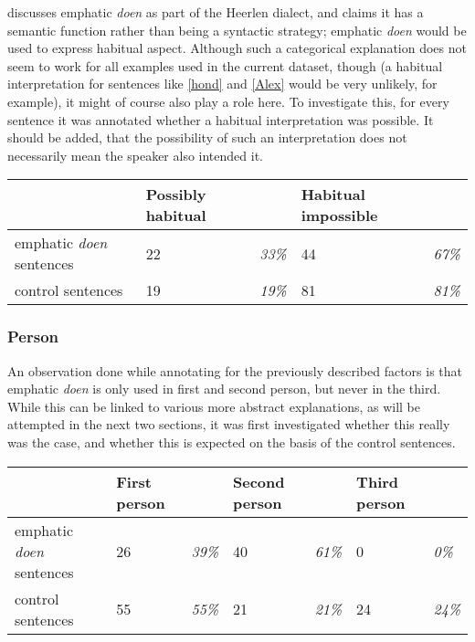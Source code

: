 \documentclass[12pt]{article}
\begin{document}
\citet{c94} discusses emphatic \emph{doen} as part of the Heerlen dialect, and claims it has a semantic function rather than being a syntactic strategy; emphatic \emph{doen} would be used to express habitual aspect. Although such a categorical explanation does not seem to work for all examples used in the current dataset, though (a habitual interpretation for sentences like \ref{hond} and \ref{Alex} would be very unlikely, for example), it might of course also play a role here. To investigate this, for every sentence it was annotated whether a habitual interpretation was possible. It should be added, that the possibility of such an interpretation does not necessarily mean the speaker also intended it.

\begin{table}[h]
\begin{tabular}{|l|ll|ll|}
\hline
&Possibly habitual&&Habitual impossible&\\
\hline
emphatic \emph{doen} sentences	&22 	& \emph{33\%}	&44		 &\emph{67\%}\\
control sentences				&19		& \emph{19\%}	&81		 &\emph{81\%}\\
\hline
\end{tabular}
\end{table}


\subsubsection{Person}

An observation done while annotating for the previously described factors is that emphatic \emph{doen} is only used in first and second person, but never in the third. While this can be linked to various more abstract explanations, as will be attempted in the next two sections, it was first investigated whether this really was the case, and whether this is expected on the basis of the control sentences.

\begin{table}[h]
\begin{tabular}{|l|ll|ll|ll|}
\hline
&First person&&Second person&&Third person&\\
\hline
emphatic \emph{doen} sentences	&26 	& \emph{39\%}	&40		&\emph{61\%} & 0 &\emph{0\%}\\
control sentences				&55		& \emph{55\%}	&21	 	&\emph{21\%} & 24 &\emph{24\%}\\
\hline
\end{tabular}
\end{table}
\end{document}
